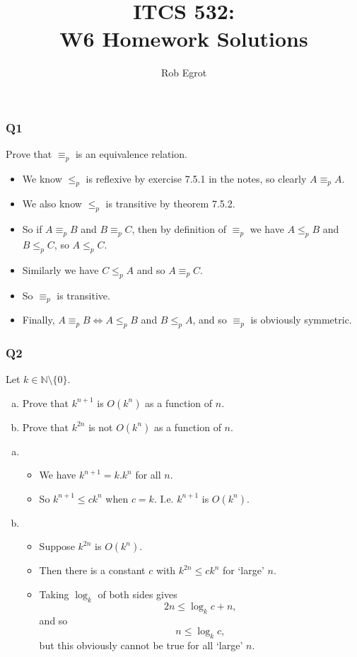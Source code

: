 \documentclass[handout]{beamer}
\title{ITCS 532:\\ W6 Homework Solutions}
\date{}
\author{Rob Egrot}
\begin{document}
\begin{frame}
\titlepage
\end{frame}

\begin{frame}
\frametitle{Q1}
Prove that $\equiv_p$ is an equivalence relation.
\vspace{0.5cm}
\begin{itemize}
\item We know $\leq_p$ is reflexive by exercise 7.5.1 in the notes, so clearly $A\equiv_p A$. 
\vspace{0.3cm}
\item We also know $\leq_p$ is transitive by theorem 7.5.2.
\vspace{0.3cm}
\item So if $A\equiv_p B$ and $B\equiv_p C$, then by definition of $\equiv_p$ we have $A\leq_p B$ and $B\leq_p C$, so $A\leq_p C$. 
\vspace{0.3cm}
\item Similarly we have $C\leq_p A$ and so $A\equiv_p C$. 
\vspace{0.3cm}
\item So $\equiv_p$ is transitive. 
\vspace{0.3cm}
\item Finally, $A\equiv_p B \iff A\leq_p B$ and $B\leq_p A$, and so $\equiv_p$ is obviously symmetric.
\end{itemize}
\end{frame}

\begin{frame}
\frametitle{Q2}
Let $k\in \mathbb{N}\setminus\{0\}$.
\begin{enumerate}[a)]
\item Prove that $k^{n+1}$ is $O(k^n)$ as a function of $n$.
\item Prove that $k^{2n}$ is not $O(k^n)$ as a function of $n$.
\end{enumerate}
\vspace{0.5cm}
\begin{enumerate}[a)]
\item \begin{itemize}
\item We have $k^{n+1} = k.k^n $ for all $n$. 
\item So $k^{n+1}\leq ck^n$ when $c=k$. I.e. $k^{n+1}$ is $O(k^n)$.
\end{itemize} 
\vspace{0.5cm}
\item \begin{itemize}
\item Suppose $k^{2n}$ is $O(k^n)$. 
\item Then there is a constant $c$ with $k^{2n}\leq ck^n$ for `large' $n$. 
\item Taking $\log_k$ of both sides gives
\[2n\leq \log_k c + n,\]
and so
\[n \leq \log_k c,\]
but this obviously cannot be true for all `large' $n$. 
\end{itemize}
\end{enumerate}
\end{frame}
\end{document}
